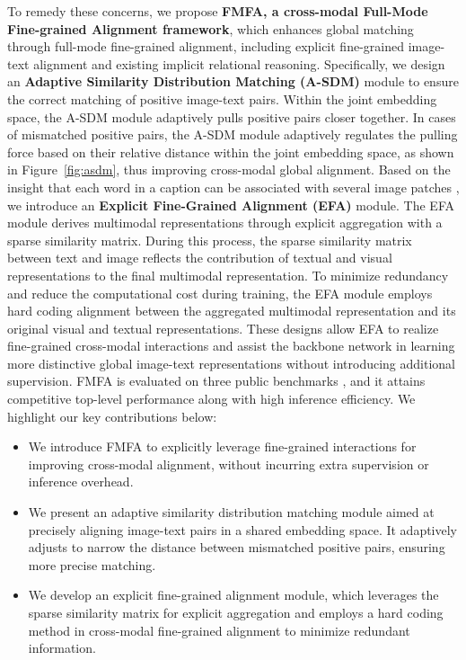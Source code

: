 \documentclass[acmsmall]{acmart}
\begin{document}
To remedy these concerns, we propose {\bfseries FMFA, a cross-modal
Full-Mode Fine-grained Alignment framework}, which enhances global
matching through full-mode fine-grained alignment, including
explicit fine-grained image-text alignment and existing implicit
relational reasoning. Specifically, we design an {\bfseries Adaptive
Similarity Distribution Matching (A-SDM)} module to ensure the
correct matching of positive image-text pairs. Within the joint
embedding space, the A-SDM module adaptively pulls positive pairs
closer together. In cases of mismatched positive pairs, the A-SDM
module adaptively regulates the pulling force based on their
relative distance within the joint embedding space, as shown in
Figure~\ref{fig:asdm}, thus improving cross-modal global alignment.
Based on the insight that each word in a caption can be associated
with several image patches \cite{bica2024improving}, we introduce an
{\bfseries Explicit Fine-Grained Alignment (EFA)} module. The EFA
module derives multimodal representations through explicit
aggregation with a sparse similarity matrix. During this process,
the sparse similarity matrix between text and image reflects the
contribution of textual and visual representations to the final
multimodal representation. To minimize redundancy and reduce the
computational cost during training, the EFA module employs hard
coding alignment between the aggregated multimodal representation
and its original visual and textual representations. These designs
allow EFA to realize fine-grained cross-modal interactions and
assist the backbone network in learning more distinctive global
image-text representations without introducing additional
supervision. FMFA is evaluated on three public benchmarks
\cite{li2017person, ding2021semantically, zhu2021dssl}, and it
attains competitive top-level performance along with high inference
efficiency. We highlight our key contributions below:
\begin{itemize}
    \item We introduce FMFA to explicitly leverage fine-grained interactions
for improving cross-modal alignment, without incurring extra
supervision or inference overhead.
    \item We present an adaptive similarity distribution matching module aimed
at precisely aligning image-text pairs in a shared embedding space.
It adaptively adjusts to narrow the distance between mismatched
positive pairs, ensuring more precise matching.
    \item We develop an explicit fine-grained alignment module, which
leverages the sparse similarity matrix for explicit aggregation and
employs a hard coding method in cross-modal fine-grained alignment
to minimize redundant information.
\end{itemize}
\end{document}

